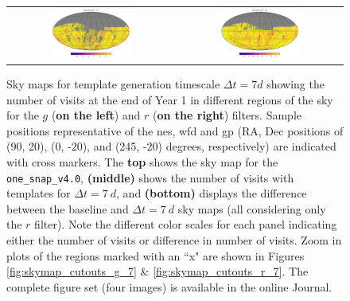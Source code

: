 \documentclass[preprintm,linenumbers]{aastex631}
\newcommand{\baseline}{\texttt{one\_snap\_v4.0}\xspace}
\begin{document}
\begin{figure}
\begin{tabular}{c c}
         \includegraphics[width=0.5\textwidth]{results/skymaps_cutout/skymaps_cutout_delta_first_year_one_snap_v4_0_10yrs_db_noDD_noTwi_tscale-7_nside-256_doAllTemplateMetrics_reduceCount_g_noDD_noTwi.pdf} &
         \includegraphics[width=0.5\textwidth]{results/skymaps_cutout/skymaps_cutout_delta_first_year_one_snap_v4_0_10yrs_db_noDD_noTwi_tscale-7_nside-256_doAllTemplateMetrics_reduceCount_r_noDD_noTwi.pdf} \\

   \end{tabular}

        \caption{Sky maps for template generation timescale $\Delta t = 7 \si{d}$ showing the number of visits at the end of Year 1 in different regions of the sky for the $g$ (\textbf{on the left}) and  $r$ (\textbf{on the right}) filters. 
        Sample positions representative of the \gls*{nes}, \gls*{wfd} and \gls*{gp} (RA, Dec positions of (90, 20), (0, -20), and (245, -20) degrees, respectively) are indicated with cross markers. 
        The \textbf{top} shows the sky map for the \baseline, \textbf{(middle)} shows the number of visits with templates for $\Delta t = 7\ \si{d}$, and \textbf{(bottom)} displays the difference between the baseline and $\Delta t = 7\ \si{d}$ sky maps (all considering only the $r$ filter). Note the different color scales for each panel indicating either the number of visits or difference in number of visits. 
        Zoom in plots of the regions marked with an ``x" are shown in Figures \ref{fig:skymap_cutouts_g_7} \& \ref{fig:skymap_cutouts_r_7}. 
        The complete figure set (four images) is available in the online Journal. 
        }
        \label{fig:all_together_r_7d}
	\end{figure}
\end{document}
